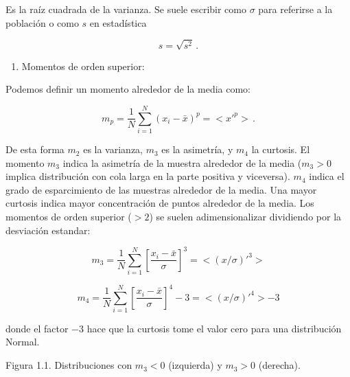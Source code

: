\documentclass[
]{agujournal2019}
\providecommand{\tightlist}{%
  \setlength{\itemsep}{0pt}\setlength{\parskip}{0pt}}\usepackage{longtable,booktabs,array}
\begin{document}
Es la raíz cuadrada de la varianza. Se suele escribir como \(\sigma\)
para referirse a la población o como \(s\) en estadística

\begin{equation}
s=\sqrt{s^2}\,.
\end{equation}

\vspace{0.5cm}

\begin{enumerate}
\def\labelenumi{\arabic{enumi}.}
\setcounter{enumi}{3}
\tightlist
\item
  Momentos de orden superior:\\
\end{enumerate}

Podemos definir un momento alrededor de la media como:

\begin{equation}
m_p=\frac{1}{N}\sum^N_{i=1}(x_i-\bar{x})^p=<x'^p>\,.
\end{equation}

De esta forma \(m_2\) es la varianza, \(m_3\) es la asimetría, y \(m_4\)
la curtosis. El momento \(m_3\) indica la asimetría de la muestra
alrededor de la media (\(m_3>0\) implica distribución con cola larga en
la parte positiva y viceversa). \(m_4\) indica el grado de esparcimiento
de las muestras alrededor de la media. Una mayor curtosis indica mayor
concentración de puntos alrededor de la media. Los momentos de orden
superior (\(>2\)) se suelen adimensionalizar dividiendo por la
desviación estandar:

\begin{equation}
    m_3=\frac{1}{N}\sum^N_{i=1}\left[\frac{x_i-\bar{x}}{\sigma}\right]^3=<(x/\sigma)'^3>
\end{equation}

\begin{equation} 
    m_4=\frac{1}{N}\sum^N_{i=1}\left[\frac{x_i-\bar{x}}{\sigma}\right]^4-3=<(x/\sigma)'^4>-3
\end{equation}

donde el factor \(-3\) hace que la curtosis tome el valor cero para una
distribución Normal.

\vspace{0.5cm}

\begin{center}
\end{center}

\begin{center}
Figura 1.1. Distribuciones con $m_3<0$ (izquierda) y $m_3>0$ (derecha).
\end{center}
\end{document}

